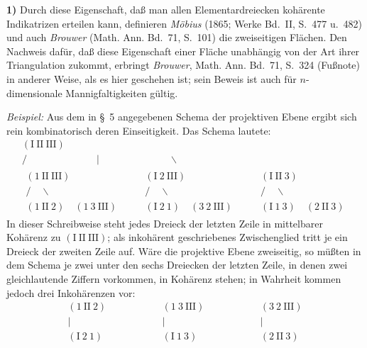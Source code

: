 \documentclass{article}
\begin{document}
\textbf{1)} Durch diese Eigenschaft, daß man allen Elementardreiecken kohärente Indikatrizen erteilen kann, definieren \emph{Möbius} (1865; Werke Bd.~II, S.~477 u.~482) und auch \emph{Brouwer} (Math. Ann. Bd.~71, S.~101) die zweiseitigen Flächen. Den Nachweis dafür, daß diese Eigenschaft einer Fläche unabhängig von der Art ihrer Triangulation zukommt, erbringt \emph{Brouwer}, Math. Ann. Bd.~71, S.~324 (Fußnote) in anderer Weise, als es hier geschehen ist; sein Beweis ist auch für $n$-dimensionale Mannigfaltigkeiten gültig.

\emph{Beispiel:} Aus dem in §~5 angegebenen Schema der projektiven Ebene ergibt sich rein kombinatorisch deren Einseitigkeit. Das Schema lautete:
\[
\begin{gathered}
(\mathrm{I}\ \mathrm{II}\ \mathrm{III}) \\
/\qquad\qquad\qquad\quad |\quad\qquad\qquad\qquad \backslash \\
\begin{matrix}
(1\ \mathrm{II}\ \mathrm{III}) \\
/\quad\backslash \\
(1\ \mathrm{II}\ 2) \quad (1\ 3\ \mathrm{III})
\end{matrix}
\qquad
\begin{matrix}
(\mathrm{I}\ 2\ \mathrm{III}) \\
/\quad\backslash \\
(\mathrm{I}\ 2\ 1) \quad (3\ 2\ \mathrm{III})
\end{matrix}
\qquad
\begin{matrix}
(\mathrm{I}\ \mathrm{II}\ 3) \\
/\quad\backslash \\
(\mathrm{I}\ 1\ 3) \quad (2\ \mathrm{II}\ 3)
\end{matrix}
\end{gathered}
\]
In dieser Schreibweise steht jedes Dreieck der letzten Zeile in mittelbarer Kohärenz zu $(\mathrm{I}\ \mathrm{II}\ \mathrm{III})$; als inkohärent geschriebenes Zwischenglied tritt je ein Dreieck der zweiten Zeile auf. Wäre die projektive Ebene zweiseitig, so müßten in dem Schema je zwei unter den sechs Dreiecken der letzten Zeile, in denen zwei gleichlautende Ziffern vorkommen, in Kohärenz stehen; in Wahrheit kommen jedoch drei Inkohärenzen vor:
\[
\begin{array}{ccccc}
(1\ \mathrm{II}\ 2) & \qquad\qquad & (1\ 3\ \mathrm{III}) & \qquad\qquad & (3\ 2\ \mathrm{III}) \\
| & & | & & | \\
(\mathrm{I}\ 2\ 1) & & (\mathrm{I}\ 1\ 3) & & (2\ \mathrm{II}\ 3)
\end{array}
\]
\end{document}
